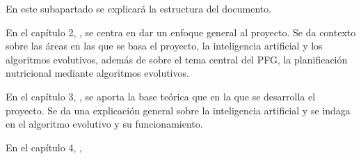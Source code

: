 En este subapartado se explicará la estructura del documento.

En el capítulo 2, , se centra en dar un enfoque general al proyecto. Se da contexto sobre las áreas en las que se basa el proyecto, la inteligencia artificial y los algoritmos evolutivos, además de sobre el tema central del PFG, la planificación nutricional mediante algoritmos evolutivos.

En el capítulo 3, , se aporta la base teórica que en la que se desarrolla el proyecto. Se da una explicación general sobre la inteligencia artificial y se indaga en el algoritmo evolutivo y su funcionamiento.

En el capítulo 4, , 